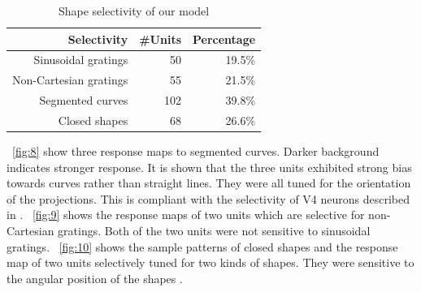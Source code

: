 \documentclass[twocolumn]{article}
\begin{document}
\begin{table}[h]
\caption{Shape selectivity of our model}
\centering
\begin{tabular}{|r|r|r|}
\hline
Selectivity & \#Units & Percentage \\\hline
Sinusoidal gratings & 50 & 19.5\% \\\hline
Non-Cartesian gratings & 55 & 21.5\% \\\hline
Segmented curves & 102 & 39.8\% \\\hline
Closed shapes & 68 & 26.6\% \\\hline
\end{tabular}
\label{tab:1}
\end{table}

\figurename~\ref{fig:8} show three response maps to segmented curves.
Darker background indicates stronger response.
It is shown that the three units exhibited strong bias towards curves rather than straight lines.
They were all tuned for the orientation of the projections.
This is compliant with the selectivity of V4 neurons described in \cite{pasupathy1999}.
\figurename~\ref{fig:9} shows the response maps of two units which are selective for non-Cartesian gratings.
Both of the two units were not sensitive to sinusoidal gratings.
\figurename~\ref{fig:10} shows the sample patterns of closed shapes and the response map of two units selectively tuned for two kinds of shapes.
They were sensitive to the angular position of the shapes \cite{pasupathy2001}.
\end{document}
